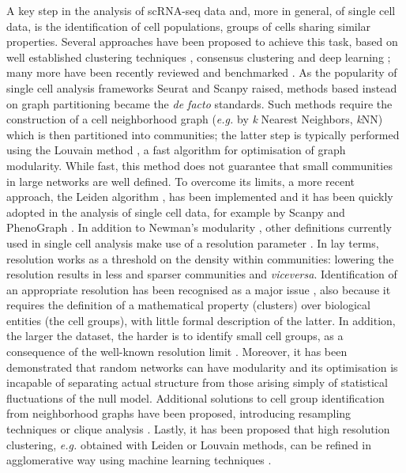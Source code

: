 \documentclass{bmcart}
\begin{document}
A key step in the analysis of scRNA-seq data and, more in general, of single cell data, is the identification of cell populations, groups of cells sharing similar properties. Several approaches have been proposed to achieve this task, based on well established clustering techniques \cite{wang_2017, lin_2017}, consensus clustering \cite{huh_2020, kiselev_2017} and deep learning \cite{li_2020}; many more have been recently reviewed \cite{krzak_2019, kiselev_2019} and benchmarked \cite{du_2018}. As the popularity of single cell analysis frameworks Seurat \cite{butler_2018} and Scanpy \cite{wolf_2018} raised, methods based instead on graph partitioning became the \emph{de facto} standards. Such methods require the construction of a cell neighborhood graph (\emph{e.g.} by \emph{k} Nearest Neighbors, \emph{k}NN) which is then partitioned into communities; the latter step is typically performed using the Louvain method \cite{blondel_2008}, a fast algorithm for optimisation of graph modularity. While fast, this method does not guarantee that small communities in large networks are well defined. To overcome its limits, a more recent approach, the Leiden algorithm \cite{traag_2019}, has been implemented and it has been quickly adopted in the analysis of single cell data, for example by Scanpy and PhenoGraph \cite{levine_2015}. In addition to Newman's modularity \cite{newman_2004}, other definitions currently used in single cell analysis make use of a resolution parameter \cite{traag_2011, reichardt_2006} . In lay terms, resolution works as a threshold on the density within communities: lowering the resolution results in less and sparser communities and \emph{viceversa}. Identification of an appropriate resolution has been recognised as a major issue \cite{lhnemann_2020}, also because it requires the definition of a mathematical property (clusters) over biological entities (the cell groups), with little formal description of the latter. In addition, the larger the dataset, the harder is to identify small cell groups, as a consequence of the well-known resolution limit \cite{fortunato_2007}. Moreover, it has been demonstrated that random networks can have modularity \cite{guimer_2004} and its optimisation is incapable of separating actual structure from those arising simply of statistical fluctuations of the null model. Additional solutions to cell group identification from neighborhood graphs have been proposed, introducing resampling techniques \cite{baran_2019} or clique analysis \cite{xu_2015}. Lastly, it has been proposed that high resolution clustering, \emph{e.g.} obtained with Leiden or Louvain methods, can be refined in agglomerative way using machine learning techniques \cite{miao_2020}.
\end{document}
